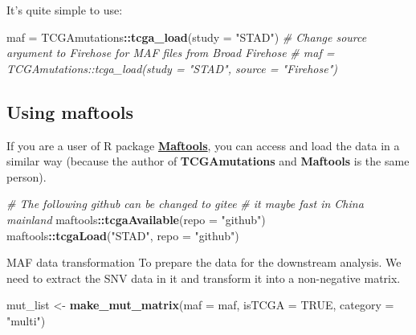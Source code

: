 \documentclass[
  12pt,
]{book}
\newenvironment{Shaded}{\begin{snugshade}}{\end{snugshade}}
\newcommand{\AttributeTok}[1]{\textcolor[rgb]{0.13,0.29,0.53}{#1}}
\newcommand{\CommentTok}[1]{\textcolor[rgb]{0.56,0.35,0.01}{\textit{#1}}}
\newcommand{\ConstantTok}[1]{\textcolor[rgb]{0.56,0.35,0.01}{#1}}
\newcommand{\FunctionTok}[1]{\textcolor[rgb]{0.13,0.29,0.53}{\textbf{#1}}}
\newcommand{\NormalTok}[1]{#1}
\newcommand{\OtherTok}[1]{\textcolor[rgb]{0.56,0.35,0.01}{#1}}
\newcommand{\SpecialCharTok}[1]{\textcolor[rgb]{0.81,0.36,0.00}{\textbf{#1}}}
\newcommand{\StringTok}[1]{\textcolor[rgb]{0.31,0.60,0.02}{#1}}
\begin{document}
It's quite simple to use:

\begin{Shaded}
\begin{Highlighting}[]
\NormalTok{maf }\OtherTok{=}\NormalTok{ TCGAmutations}\SpecialCharTok{::}\FunctionTok{tcga\_load}\NormalTok{(}\AttributeTok{study =} \StringTok{"STAD"}\NormalTok{)}
\CommentTok{\# Change \textasciigrave{}source\textasciigrave{} argument to Firehose for MAF files from Broad Firehose}
\CommentTok{\# maf = TCGAmutations::tcga\_load(study = "STAD", source = "Firehose")}
\end{Highlighting}
\end{Shaded}

\hypertarget{using-maftools}{%
\subsection{Using maftools}\label{using-maftools}}

If you are a user of R package \textbf{\href{https://github.com/PoisonAlien/maftools}{Maftools}}, you can access and load the data in a similar way (because the author of \textbf{TCGAmutations} and \textbf{Maftools} is the same person).

\begin{Shaded}
\begin{Highlighting}[]
\CommentTok{\# The following github can be changed to gitee}
\CommentTok{\# it maybe fast in China mainland}
\NormalTok{maftools}\SpecialCharTok{::}\FunctionTok{tcgaAvailable}\NormalTok{(}\AttributeTok{repo =} \StringTok{"github"}\NormalTok{)}
\NormalTok{maftools}\SpecialCharTok{::}\FunctionTok{tcgaLoad}\NormalTok{(}\StringTok{"STAD"}\NormalTok{, }\AttributeTok{repo =} \StringTok{"github"}\NormalTok{)}
\end{Highlighting}
\end{Shaded}

MAF data transformation
To prepare the data for the downstream analysis. We need to extract the SNV data in it and transform it into a non-negative matrix.

\begin{Shaded}
\begin{Highlighting}[]
\NormalTok{mut\_list }\OtherTok{\textless{}{-}} \FunctionTok{make\_mut\_matrix}\NormalTok{(}\AttributeTok{maf =}\NormalTok{ maf, }\AttributeTok{isTCGA =} \ConstantTok{TRUE}\NormalTok{, }\AttributeTok{category =} \StringTok{"multi"}\NormalTok{)}
\end{Highlighting}
\end{Shaded}
\end{document}
